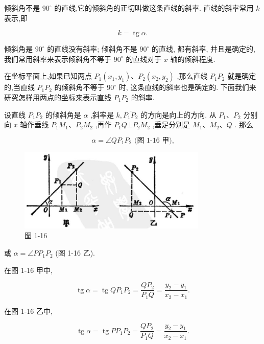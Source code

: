 \documentclass[lang=cn,newtx,10pt,scheme=chinese]{elegantbook}
\begin{document}
\begin{definition}[斜率]
  倾斜角不是 \({90}^{ \circ }\) 的直线,它的倾斜角的正切叫做这条直线的斜率. 直线的斜率常用 \(k\) 表示,即

\[
  k = \operatorname{tg}\alpha \text{.}
\]

倾斜角是 \({90}^{ \circ }\) 的直线没有斜率; 倾斜角不是 \({90}^{ \circ }\) 的直线, 都有斜率, 并且是确定的, 我们常用斜率来表示倾斜角不等于 \({90}^{ \circ }\) 的直线对于 \(x\) 轴的倾斜程度.
\end{definition}

在坐标平面上,如果已知两点 \({P}_{1}\left( {{x}_{1},{y}_{1}}\right) \text{、}{P}_{2}\left( {{x}_{2},{y}_{2}}\right)\) ,那么直线 \({P}_{1}{P}_{2}\) 就是确定的,当直线 \({P}_{1}{P}_{2}\) 的倾斜角不等于 \({90}^{ \circ }\) 时, 这条直线的斜率也是确定的. 下面我们来研究怎样用两点的坐标来表示直线 \({P}_{1}{P}_{2}\) 的斜率.

设直线 \({P}_{1}{P}_{2}\) 的倾斜角是 \(\alpha\) ,斜率是 \(k,\overline{{P}_{1}{P}_{2}}\) 的方向是向上的方向. 从 \({P}_{1}\text{、}{P}_{2}\) 分别向 \(x\) 轴作垂线 \({P}_{1}{M}_{1}\text{、}{P}_{2}{M}_{2}\) ,再作 \({P}_{1}Q \bot {P}_{2}{M}_{2}\) ,垂足分别是 \({M}_{1}\text{、}{M}_{2}\text{、}Q\) . 那么

\[
  \alpha = \angle Q{P}_{1}{P}_{2}\text{ (图 1-16 甲),}
\]

\begin{figure}[h]
  \centering
  \includegraphics[max width=0.8\textwidth]{images/01912cc2-ffb6-728e-9ae7-b113ff05c64b_20_458905.jpg}
  \caption{图 1-16}
\end{figure}



或 \(\alpha = \angle P{P}_{1}{P}_{2}\) (图 1-16 乙).

在图 1-16 甲中,

\[
  \operatorname{tg}\alpha = \operatorname{tg}Q{P}_{1}{P}_{2} = \frac{Q{P}_{2}}{{P}_{1}Q} = \frac{{y}_{2} - {y}_{1}}{{x}_{2} - {x}_{1}}.
\]

在图 1-16 乙中,

\[
  \operatorname{tg}\alpha = \operatorname{tg}P{P}_{1}{P}_{2} = \frac{Q{P}_{2}}{{P}_{1}Q} = \frac{{y}_{2} - {y}_{1}}{{x}_{2} - {x}_{1}}.
\]
\end{document}

